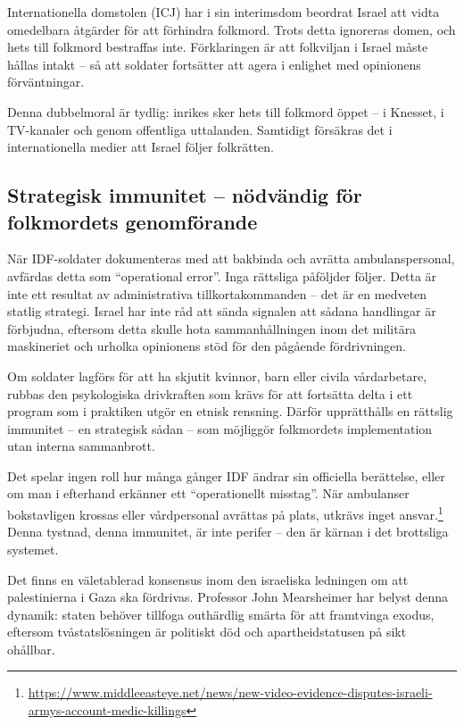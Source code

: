 Internationella domstolen (ICJ) har i sin interimsdom beordrat Israel att vidta omedelbara åtgärder för att förhindra folkmord. Trots detta ignoreras domen, och hets till folkmord bestraffas inte. Förklaringen är att folkviljan i Israel måste hållas intakt – så att soldater fortsätter att agera i enlighet med opinionens förväntningar.

Denna dubbelmoral är tydlig: inrikes sker hets till folkmord öppet – i Knesset, i TV-kanaler och genom offentliga uttalanden. Samtidigt försäkras det i internationella medier att Israel följer folkrätten.


\subsection{Strategisk immunitet – nödvändig för folkmordets genomförande}

När IDF-soldater dokumenteras med att bakbinda och avrätta ambulanspersonal, avfärdas detta som \enquote{operational error}. Inga rättsliga påföljder följer. Detta är inte ett resultat av administrativa tillkortakommanden – det är en medveten statlig strategi. Israel har inte råd att sända signalen att sådana handlingar är förbjudna, eftersom detta skulle hota sammanhållningen inom det militära maskineriet och urholka opinionens stöd för den pågående fördrivningen.

Om soldater lagförs för att ha skjutit kvinnor, barn eller civila vårdarbetare, rubbas den psykologiska drivkraften som krävs för att fortsätta delta i ett program som i praktiken utgör en etnisk rensning. Därför upprätthålls en rättslig immunitet – en strategisk sådan – som möjliggör folkmordets implementation utan interna sammanbrott.

Det spelar ingen roll hur många gånger IDF ändrar sin officiella berättelse, eller om man i efterhand erkänner ett \enquote{operationellt misstag}. När ambulanser bokstavligen krossas eller vårdpersonal avrättas på plats, utkrävs inget ansvar.\footnote{\url{https://www.middleeasteye.net/news/new-video-evidence-disputes-israeli-armys-account-medic-killings}} Denna tystnad, denna immunitet, är inte perifer – den är kärnan i det brottsliga systemet.

Det finns en väletablerad konsensus inom den israeliska ledningen om att palestinierna i Gaza ska fördrivas. Professor John Mearsheimer har belyst denna dynamik: staten behöver tillfoga outhärdlig smärta för att framtvinga exodus, eftersom tvåstatslösningen är politiskt död och apartheidstatusen på sikt ohållbar.

